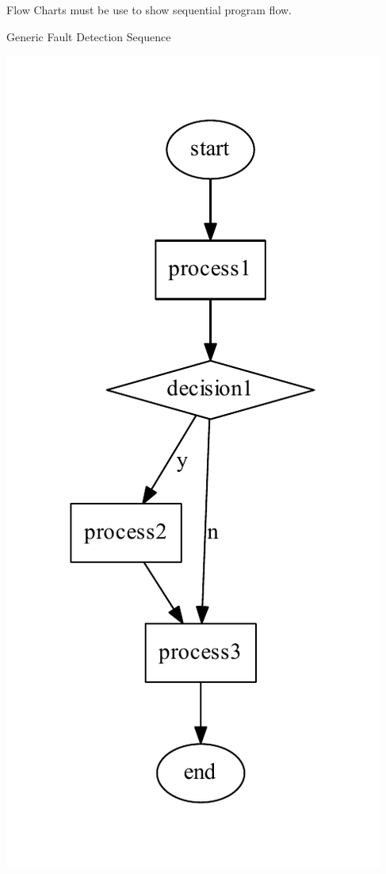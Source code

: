 Flow Charts must be use to show sequential program flow. 

Generic Fault Detection Sequence \begin{center}

\begin{DoxyImageNoCaption}
  \mbox{\includegraphics[width=\textwidth]{dot_inline_dotgraph_1}}
\end{DoxyImageNoCaption}
\end{center}


